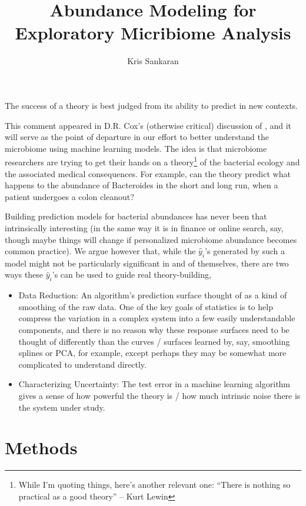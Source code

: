 \documentclass{article}
\title{Abundance Modeling for Exploratory Micribiome Analysis}
\author{Kris Sankaran}
\begin{document}
\maketitle

\begin{displayquote}
The success of a theory is best judged from its ability to predict
  in new contexts.
\end{displayquote}

This comment appeared in D.R. Cox's (otherwise critical) discussion of
\cite{breiman2001statistical}, and it will serve as the point of departure in
our effort to better understand the microbiome using machine learning models.
The idea is that microbiome researchers are trying to get their hands on a
theory\footnote{While I'm quoting things, here's another relevant one: ``There
  is nothing so practical as a good theory'' -- Kurt Lewin} of the bacterial
ecology and the associated medical consequences. For example, can the theory
predict what happens to the abundance of Bacteroides in the short and long run,
when a patient undergoes a colon cleanout?

Building prediction models for bacterial abundances has never been that
intrinsically interesting (in the same way it is in finance or online search,
say, though maybe things will change if personalized microbiome abundance
becomes common practice). We argue however that, while the $\hat{y}_{i}$'s
generated by such a model might not be particularly significant in and of
themselves, there are two ways these $\hat{y}_{i}$'s can be used to guide real
theory-building,

\begin{itemize}
\item Data Reduction: An algorithm's prediction surface thought of as a kind of
  smoothing of the raw data. One of the key goals of statistics is to help
  compress the variation in a complex system into a few easily understandable
  components, and there is no reason why these response surfaces need to be
  thought of differently than the curves / surfaces learned by, say, smoothing
  splines or PCA, for example, except perhaps they may be somewhat more
  complicated to understand directly.
\item Characterizing Uncertainty: The test error in a machine learning algorithm
  gives a sense of how powerful the theory is / how much intrinsic noise there
  is the system under study.
\end{itemize}

\section{Methods}
\end{document}
